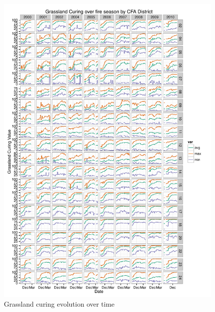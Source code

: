 \documentclass[11pt,a4paper]{article}
\begin{document}
\begin{figure}[p]
\includegraphics[width=1\columnwidth]{figures/curdist.pdf}
  \caption{Grassland curing evolution over time }
  \label{fig:cur_evol}
\end{figure}
\end{document}
